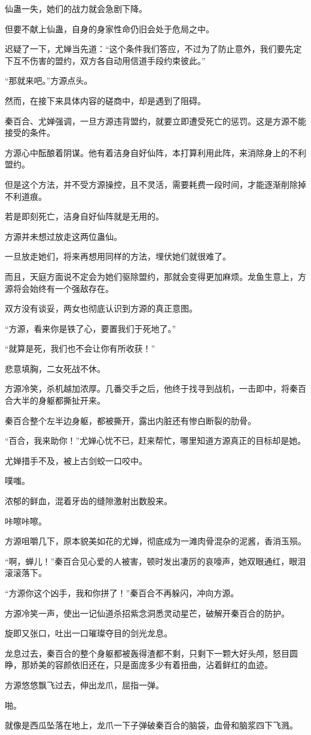 \begin{this_body}
仙蛊一失，她们的战力就会急剧下降。

但要不献上仙蛊，自身的身家性命仍旧会处于危局之中。

迟疑了一下，尤婵当先道：“这个条件我们答应，不过为了防止意外，我们要先定下互不伤害的盟约，双方各自动用信道手段约束彼此。”

“那就来吧。”方源点头。

然而，在接下来具体内容的磋商中，却是遇到了阻碍。

秦百合、尤婵强调，一旦方源违背盟约，就要立即遭受死亡的惩罚。这是方源不能接受的条件。

方源心中酝酿着阴谋。他有着洁身自好仙阵，本打算利用此阵，来消除身上的不利盟约。

但是这个方法，并不受方源操控，且不灵活，需要耗费一段时间，才能逐渐削除掉不利道痕。

若是即刻死亡，洁身自好仙阵就是无用的。

方源并未想过放走这两位蛊仙。

一旦放走她们，将来再想用同样的方法，埋伏她们就很难了。

而且，天庭方面说不定会为她们驱除盟约，那就会变得更加麻烦。龙鱼生意上，方源将会始终有一个强敌存在。

双方没有谈妥，两女也彻底认识到方源的真正意图。

“方源，看来你是铁了心，要置我们于死地了。”

“就算是死，我们也不会让你有所收获！”

悲意填胸，二女死战不休。

方源冷笑，杀机越加浓厚。几番交手之后，他终于找寻到战机，一击即中，将秦百合大半的身躯都撕扯开来。

秦百合整个左半边身躯，都被撕开，露出内脏还有惨白断裂的肋骨。

“百合，我来助你！”尤婵心忧不已，赶来帮忙，哪里知道方源真正的目标却是她。

尤婵措手不及，被上古剑蛟一口咬中。

噗嗤。

浓郁的鲜血，混着牙齿的缝隙激射出数股来。

咔嚓咔嚓。

方源咀嚼几下，原本貌美如花的尤婵，彻底成为一滩肉骨混杂的泥酱，香消玉殒。

“啊，蝉儿！”秦百合见心爱的人被害，顿时发出凄厉的哀嚎声，她双眼通红，眼泪滚滚落下。

“方源你这个凶手，我和你拼了！”秦百合不再躲闪，冲向方源。

方源冷笑一声，使出一记仙道杀招紫念洞悉灵动星芒，破解开秦百合的防护。

旋即又张口，吐出一口璀璨夺目的剑光龙息。

龙息过去，秦百合的整个身躯都被轰得渣都不剩，只剩下一颗大好头颅，怒目圆睁，那娇美的容颜依旧还在，只是面庞多少有着扭曲，沾着鲜红的血迹。

方源悠悠飘飞过去，伸出龙爪，屈指一弹。

啪。

就像是西瓜坠落在地上，龙爪一下子弹破秦百合的脑袋，血骨和脑浆四下飞溅。

\end{this_body}


